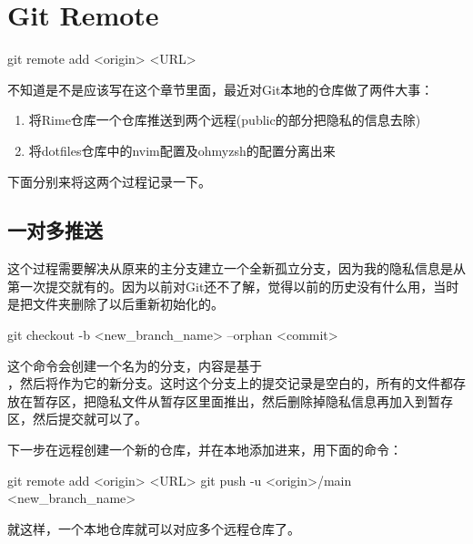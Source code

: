 \section{Git Remote}
\begin{shellcmd}
git remote add <origin> <URL>
\end{shellcmd}

不知道是不是应该写在这个章节里面，最近对Git本地的仓库做了两件大事：

\begin{enumerate}
	\item 将Rime仓库一个仓库推送到两个远程(public的部分把隐私的信息去除)
	\item 将dotfiles仓库中的nvim配置及ohmyzsh的配置分离出来
\end{enumerate}

下面分别来将这两个过程记录一下。

\subsection{一对多推送}
这个过程需要解决从原来的主分支建立一个全新孤立分支，因为我的隐私信息是从第一次提交就有的。因为以前对Git还不了解，觉得以前的历史没有什么用，当时是把文件夹删除了以后重新初始化的。
\begin{shellcmd}
	git checkout -b <new_branch_name> --orphan <commit>
\end{shellcmd}
这个命令会创建一个名为的分支，内容是基于\\，然后将作为它的新分支。这时这个分支上的提交记录是空白的，所有的文件都存放在暂存区，把隐私文件从暂存区里面推出，然后删除掉隐私信息再加入到暂存区，然后提交就可以了。

下一步在远程创建一个新的仓库，并在本地添加进来，用下面的命令：
\begin{shellcmd}
git remote add <origin> <URL>
git push -u <origin>/main <new_branch_name>
\end{shellcmd}
就这样，一个本地仓库就可以对应多个远程仓库了。

